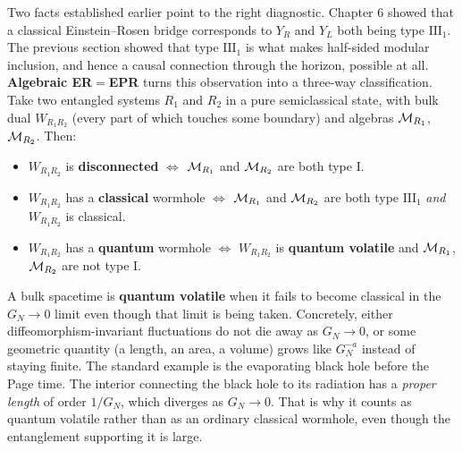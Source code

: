 Two facts established earlier point to the right diagnostic. Chapter 6 showed that a classical
Einstein--Rosen bridge corresponds to $Y_R$ and $Y_L$ both being type $\mathrm{III}_1$. The previous section
showed that type $\mathrm{III}_1$ is what makes half-sided modular inclusion, and hence a causal connection
through the horizon, possible at all. \textbf{Algebraic ER$=$EPR} turns this observation into a three-way
classification. Take two entangled systems $R_1$ and $R_2$ in a pure semiclassical state, with bulk dual
$W_{R_1R_2}$ (every part of which touches some boundary) and algebras $\mathcal{M}_{R_1}$, $\mathcal{M}_{R_2}$. Then:
\begin{itemize}
\item $W_{R_1R_2}$ is \textbf{disconnected} $\iff$ $\mathcal{M}_{R_1}$ and $\mathcal{M}_{R_2}$ are both type I.
\item $W_{R_1R_2}$ has a \textbf{classical} wormhole $\iff$ $\mathcal{M}_{R_1}$ and $\mathcal{M}_{R_2}$ are both type
$\mathrm{III}_1$ \emph{and} $W_{R_1R_2}$ is classical.
\item $W_{R_1R_2}$ has a \textbf{quantum} wormhole $\iff$ $W_{R_1R_2}$ is \textbf{quantum volatile} and
$\mathcal{M}_{R_1}$, $\mathcal{M}_{R_2}$ are not type I.
\end{itemize}
A bulk spacetime is \textbf{quantum volatile} when it fails to become classical in the $G_N\to0$ limit even
though that limit is being taken. Concretely, either diffeomorphism-invariant fluctuations do not die away as
$G_N\to0$, or some geometric quantity (a length, an area, a volume) grows like $G_N^{-a}$ instead of staying
finite. The standard example is the evaporating black hole before the Page time. The interior connecting the
black hole to its radiation has a \emph{proper length} of order $1/G_N$, which diverges as $G_N\to0$. That is
why it counts as quantum volatile rather than as an ordinary classical wormhole, even though the entanglement
supporting it is large.

